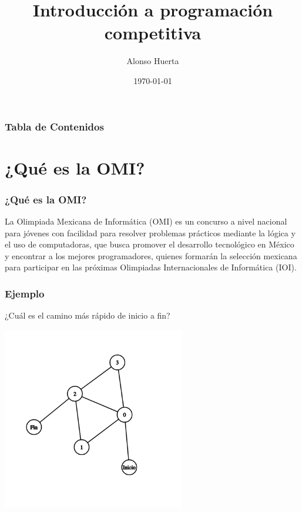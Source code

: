 \documentclass{beamer}
\title{Introducción a programación competitiva}
\author{Alonso Huerta}
\institute{Olimpiada Mexicana de Informática en Yucatán}
\date{\today}
\begin{document}
\begin{frame}
  \titlepage
\end{frame}

\begin{frame}
  \frametitle{Tabla de Contenidos}
  \tableofcontents
\end{frame}

\section{¿Qué es la OMI?}

\begin{frame}
  \frametitle{¿Qué es la OMI?}
La Olimpiada Mexicana de Informática (OMI) es un concurso a nivel nacional para jóvenes con facilidad para resolver problemas prácticos mediante la lógica y el uso de computadoras, que busca promover el desarrollo tecnológico en México y encontrar a los mejores programadores, quienes formarán la selección mexicana para participar en las próximas Olimpiadas Internacionales de Informática (IOI).
\end{frame}

\begin{frame}
  \frametitle{Ejemplo}
	¿Cuál es el camino más rápido de inicio a fin?
	\begin{center}
		\includegraphics[width=0.6\textwidth]{img/facil.png}
	\end{center}
\end{frame}
\end{document}
